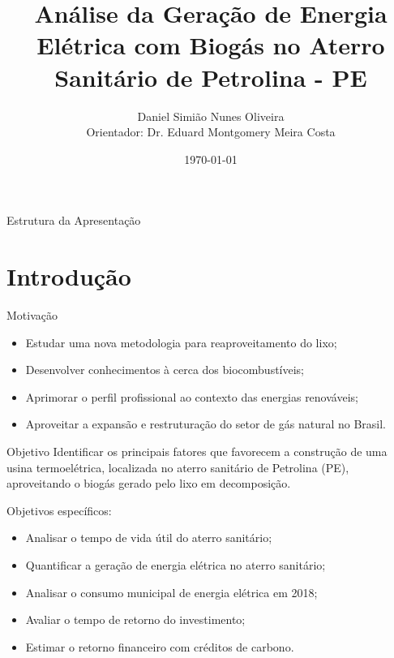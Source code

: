 \documentclass[aspectraio=169,8pt,slidestop,xcolor=table]{beamer}
\author[Daniel Simião Nunes Oliveira]{\Large{Daniel Simião Nunes Oliveira}\\ \small{Orientador: Dr. Eduard Montgomery Meira Costa}}
\title[Análise da Geração de Energia Elétrica com Biogás no Aterro Sanitário de Petrolina - PE]{Análise da Geração de Energia Elétrica com Biogás no Aterro Sanitário de Petrolina - PE}
\institute[UNIVASF]{\large{Colegiado de Engenharia Elétrica}}
\date{\today}
\begin{document}
	\begin{frame}
	\titlepage
\end{frame}
\begin{frame}{Estrutura da Apresentação}
\tableofcontents
\end{frame}


\section{Introdução}
\begin{frame}{Motivação}

\begin{itemize}
	\item Estudar uma nova metodologia para reaproveitamento do lixo;
	\item Desenvolver conhecimentos à cerca dos biocombustíveis;
	\item Aprimorar o perfil profissional ao contexto das energias renováveis;
	\item Aproveitar a expansão e restruturação do setor de gás natural no Brasil.
\end{itemize}


\end{frame}
	

\begin{frame}{Objetivo}
Identificar os principais fatores que favorecem a construção de uma usina termoelétrica, localizada no aterro sanitário de Petrolina (PE), aproveitando o biogás gerado pelo lixo em decomposição.

\vspace{0.5cm}
Objetivos específicos:
\begin{itemize}
    \item Analisar o tempo de vida útil do aterro sanitário;
    \item Quantificar a geração de energia elétrica no aterro sanitário;
    \item Analisar o consumo municipal de energia elétrica em 2018;
    \item Avaliar o tempo de retorno do investimento;
    \item Estimar o retorno financeiro com créditos de carbono.
\end{itemize}
\end{frame}
\end{document}
